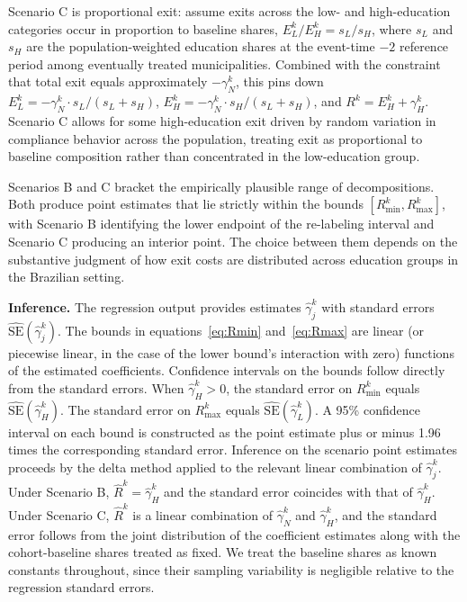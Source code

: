 Scenario C is proportional exit: assume exits across the low- and high-education categories occur in proportion to baseline shares, $E_L^k / E_H^k = s_L / s_H$, where $s_L$ and $s_H$ are the population-weighted education shares at the event-time $-2$ reference period among eventually treated municipalities. Combined with the constraint that total exit equals approximately $-\gamma_N^k$, this pins down $E_L^k = -\gamma_N^k \cdot s_L / (s_L + s_H)$, $E_H^k = -\gamma_N^k \cdot s_H / (s_L + s_H)$, and $R^k = E_H^k + \gamma_H^k$. Scenario C allows for some high-education exit driven by random variation in compliance behavior across the population, treating exit as proportional to baseline composition rather than concentrated in the low-education group.

Scenarios B and C bracket the empirically plausible range of decompositions. Both produce point estimates that lie strictly within the bounds $[R_{\min}^k, R_{\max}^k]$, with Scenario B identifying the lower endpoint of the re-labeling interval and Scenario C producing an interior point. The choice between them depends on the substantive judgment of how exit costs are distributed across education groups in the Brazilian setting.

\textbf{Inference.} The regression output provides estimates $\hat\gamma_j^k$ with standard errors $\widehat{\text{SE}}(\hat\gamma_j^k)$. The bounds in equations~\eqref{eq:Rmin} and~\eqref{eq:Rmax} are linear (or piecewise linear, in the case of the lower bound's interaction with zero) functions of the estimated coefficients. Confidence intervals on the bounds follow directly from the standard errors. When $\hat\gamma_H^k > 0$, the standard error on $R_{\min}^k$ equals $\widehat{\text{SE}}(\hat\gamma_H^k)$. The standard error on $R_{\max}^k$ equals $\widehat{\text{SE}}(\hat\gamma_L^k)$. A 95\% confidence interval on each bound is constructed as the point estimate plus or minus 1.96 times the corresponding standard error. Inference on the scenario point estimates proceeds by the delta method applied to the relevant linear combination of $\hat\gamma_j^k$. Under Scenario B, $\widehat R^k = \hat\gamma_H^k$ and the standard error coincides with that of $\hat\gamma_H^k$. Under Scenario C, $\widehat R^k$ is a linear combination of $\hat\gamma_N^k$ and $\hat\gamma_H^k$, and the standard error follows from the joint distribution of the coefficient estimates along with the cohort-baseline shares treated as fixed. We treat the baseline shares as known constants throughout, since their sampling variability is negligible relative to the regression standard errors.

